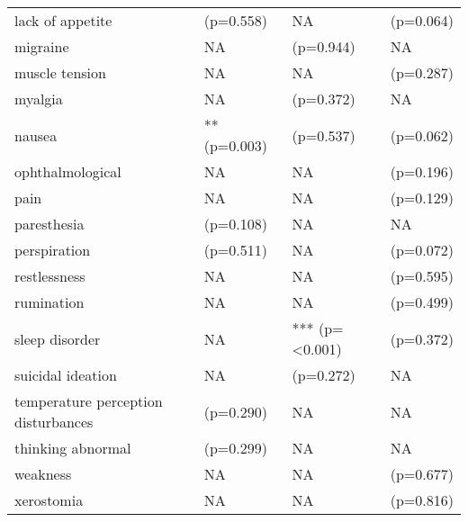 \begin{table}[!h]
\begin{tabular}[t]{llll}
lack of appetite & (p=0.558) & NA & (p=0.064)\\
\addlinespace
migraine & NA & (p=0.944) & NA\\
muscle tension & NA & NA & (p=0.287)\\
myalgia & NA & (p=0.372) & NA\\
nausea & ** (p=0.003) & (p=0.537) & (p=0.062)\\
ophthalmological & NA & NA & (p=0.196)\\
\addlinespace
pain & NA & NA & (p=0.129)\\
paresthesia & (p=0.108) & NA & NA\\
perspiration & (p=0.511) & NA & (p=0.072)\\
restlessness & NA & NA & (p=0.595)\\
rumination & NA & NA & (p=0.499)\\
\addlinespace
sleep disorder & NA & *** (p=<0.001) & (p=0.372)\\
suicidal ideation & NA & (p=0.272) & NA\\
temperature perception disturbances & (p=0.290) & NA & NA\\
thinking abnormal & (p=0.299) & NA & NA\\
weakness & NA & NA & (p=0.677)\\
\addlinespace
xerostomia & NA & NA & (p=0.816)\\
\bottomrule
\end{tabular}
\end{table}
